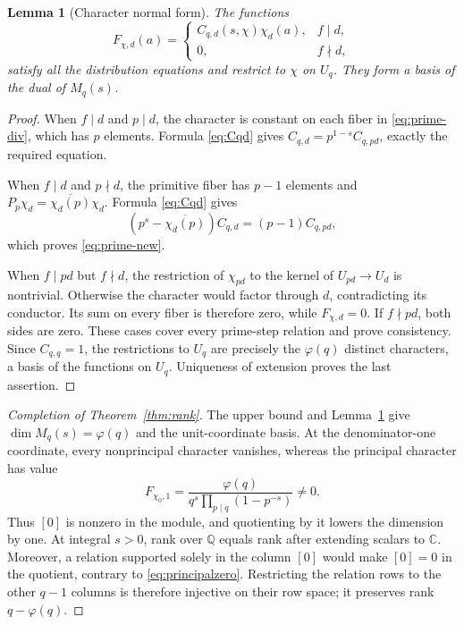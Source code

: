 \documentclass[11pt]{article}
\newtheorem{lemma}[theorem]{Lemma}
\theoremstyle{definition}
\theoremstyle{remark}
\newcommand{\CC}{\mathbb C}
\newcommand{\QQ}{\mathbb Q}
\begin{document}
\begin{lemma}[Character normal form]\label{lem:characterbasis}
The functions
\begin{equation}\label{eq:characterextension}
 F_{\chi,d}(a)=
 \begin{cases}
 C_{q,d}(s,\chi)\chi_d(a),&f\mid d,\\
 0,&f\nmid d,
 \end{cases}
\end{equation}
satisfy all the distribution equations and restrict to $\chi$ on $U_q$. They form a basis of the dual of $M_q(s)$.
\end{lemma}
\begin{proof}
When $f\mid d$ and $p\mid d$, the character is constant on each fiber in \eqref{eq:prime-div}, which has $p$ elements. Formula \eqref{eq:Cqd} gives
$C_{q,d}=p^{1-s}C_{q,pd}$, exactly the required equation.

When $f\mid d$ and $p\nmid d$, the primitive fiber has $p-1$ elements and $P_p\chi_d=\overline{\chi_d(p)}\chi_d$. Formula \eqref{eq:Cqd} gives
\[
 (p^s-\overline{\chi_d(p)})C_{q,d}=(p-1)C_{q,pd},
\]
which proves \eqref{eq:prime-new}.

When $f\mid pd$ but $f\nmid d$, the restriction of $\chi_{pd}$ to the kernel of $U_{pd}\to U_d$ is nontrivial. Otherwise the character would factor through $d$, contradicting its conductor. Its sum on every fiber is therefore zero, while $F_{\chi,d}=0$. If $f\nmid pd$, both sides are zero. These cases cover every prime-step relation and prove consistency. Since $C_{q,q}=1$, the restrictions to $U_q$ are precisely the $\varphi(q)$ distinct characters, a basis of the functions on $U_q$. Uniqueness of extension proves the last assertion.
\end{proof}

\begin{proof}[Completion of Theorem~\ref{thm:rank}]
The upper bound and Lemma~\ref{lem:characterbasis} give $\dim M_q(s)=\varphi(q)$ and the unit-coordinate basis. At the denominator-one coordinate, every nonprincipal character vanishes, whereas the principal character has value
\begin{equation}\label{eq:principalzero}
 F_{\chi_0,1}
   =\frac{\varphi(q)}{q^s\displaystyle\prod_{p\mid q}(1-p^{-s})}\neq0.
\end{equation}
Thus $[0]$ is nonzero in the module, and quotienting by it lowers the dimension by one. At integral $s>0$, rank over $\QQ$ equals rank after extending scalars to $\CC$. Moreover, a relation supported solely in the column $[0]$ would make $[0]=0$ in the quotient, contrary to \eqref{eq:principalzero}. Restricting the relation rows to the other $q-1$ columns is therefore injective on their row space; it preserves rank $q-\varphi(q)$.
\end{proof}
\end{document}
